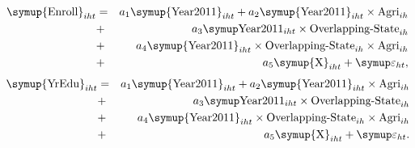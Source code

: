 \documentclass[12pt,letterpaper]{article}
\newcommand{\0}{\ensuremath{\mbox{\boldmath $0$}}}
\begin{document}
\begin{eqnarray}
	\textnormal\symup {Enroll}_{iht} & = &
    a_1 \textnormal\symup {Year2011}_{iht}
    + a_2 \textnormal\symup {Year2011}_{iht}\times\textnormal{Agri}_{ih} \nonumber\\
    &+& a_3 \textnormal\symup  \textnormal{Year2011}_{iht}\times\textnormal{Overlapping-State}_{ih} \nonumber\\
    &+& a_4 \textnormal\symup {Year2011}_{iht}\times \textnormal{Overlapping-State}_{ih}\times\textnormal{Agri}_{ih}   \nonumber \\
    &+& a_5\textnormal\symup {X}_{iht} + \symup\varepsilon_{ht}, \label{diff_enroll}
\end{eqnarray}
\begin{eqnarray}
	\textnormal\symup {YrEdu}_{iht} & = &
    a_1 \textnormal\symup {Year2011}_{iht}
    + a_2 \textnormal\symup {Year2011}_{iht}\times\textnormal{Agri}_{ih} \nonumber\\
    &+& a_3 \textnormal\symup  \textnormal{Year2011}_{iht}\times\textnormal{Overlapping-State}_{ih} \nonumber\\
    &+& a_4 \textnormal\symup {Year2011}_{iht}\times \textnormal{Overlapping-State}_{ih}\times\textnormal{Agri}_{ih}   \nonumber \\
    &+& a_5\textnormal\symup {X}_{iht} + \symup\varepsilon_{ht}. \label{diff_edu}
\end{eqnarray}


 
\end{document}
